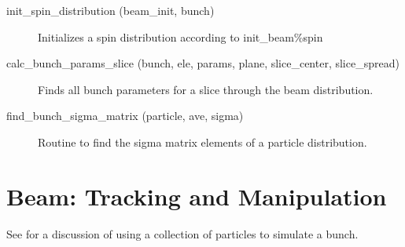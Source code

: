 \begin{description}
\item[init_spin_distribution (beam_init, bunch)] \Newline 
Initializes a spin distribution according to init_beam\%spin

\item[calc_bunch_params_slice (bunch, ele, params, plane, slice_center, slice_spread)] \Newline 
Finds all bunch parameters for a slice through the beam distribution.

\item[find_bunch_sigma_matrix (particle, ave, sigma)] \Newline 
Routine to find the sigma matrix elements of a particle distribution.

\end{description}

\section{Beam: Tracking and Manipulation}
\label{r:beam}    

See  for a discussion of using a collection of particles to simulate
a bunch.

